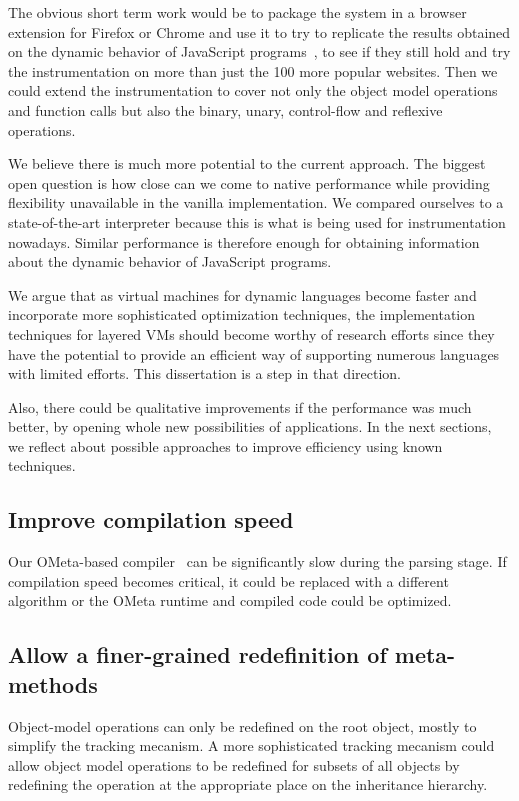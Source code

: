 The obvious short term work would be to package the system in a browser
extension for Firefox or Chrome and use it to try to replicate the results
obtained on the dynamic behavior of JavaScript programs~\cite{behavior_js}, to
see if they still hold and try the instrumentation on more than just the 100
more popular websites. Then we could extend the instrumentation to cover not
only the object model operations and function calls but also the binary, unary,
control-flow and reflexive operations.

We believe there is much more potential to the current approach. The
biggest open question is how close can we come to native performance while
providing flexibility unavailable in the vanilla implementation. We compared
ourselves to a state-of-the-art interpreter because this is what is being used
for instrumentation nowadays. Similar performance is therefore enough for
obtaining information about the dynamic behavior of JavaScript programs. 

We argue that as virtual machines for dynamic languages become faster and
incorporate more sophisticated optimization techniques, the implementation
techniques for layered VMs should become worthy of research efforts since they
have the potential to provide an efficient way of supporting numerous languages
with limited efforts. This dissertation is a step in that direction.

Also, there could be qualitative improvements if the performance was much
better, by opening whole new possibilities of applications.  In the next
sections, we reflect about possible approaches to improve efficiency
using known techniques.

\subsection{Improve compilation speed}

Our OMeta-based compiler~\cite{Warth:2007} can be significantly slow during the
parsing stage. If compilation speed becomes critical, it could be replaced with
a different algorithm or the OMeta runtime and compiled code could be
optimized.

\subsection{Allow a finer-grained redefinition of meta-methods}

Object-model operations can only be redefined on the root object, mostly to
simplify the tracking mecanism. A more sophisticated tracking mecanism could
allow object model operations to be redefined for subsets of all objects by
redefining the operation at the appropriate place on the inheritance hierarchy.

